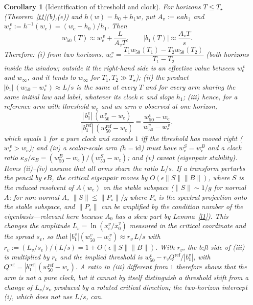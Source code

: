 \documentclass[11pt]{article}
\newtheorem{corollary}{Corollary}
\theoremstyle{definition}
\theoremstyle{remark}
\newcommand{\wcrit}{w_{\mathrm c}}
\newcommand{\wfifty}{w_{50}}
\newcommand{\xc}{x_{\mathrm c}}
\newcommand{\xmed}{\tilde x_0}
\newcommand{\Tstar}{T_\star}
\begin{document}
\begin{corollary}[Identification of threshold and clock]\label{c2}
For horizons $T\le\Tstar$ (Theorem~\ref{t1}(b),(e)) and $h(w)=h_0+h_1w$, put $A_v:=\kappa a h_1$ and $\wcrit^{\,v}:=h^{-1}(\wcrit)=(\wcrit-h_0)/h_1$. Then
\[
\wfifty(T)\approx\wcrit^{\,v}+\frac{L}{A_vT},\qquad |b_1(T)|\approx\frac{A_vT}{s}.
\]
Therefore: (i) from two horizons, $\wcrit^{\,v}=\dfrac{T_1\wfifty(T_1)-T_2\wfifty(T_2)}{T_1-T_2}$ (both horizons inside the window; outside it the right-hand side is an effective value between $\wcrit^{\,v}$ and $w_\infty$, and it tends to $w_\infty$ for $T_1,T_2\gg\Tstar$); (ii) the product $|b_1|\,(\wfifty-\wcrit^{\,v})\approx L/s$ is the same at every $T$ and for every arm sharing the same initial law and label, whatever its clock $\kappa$ and slope $h_1$; (iii) hence, for a reference arm with threshold $\wcrit$ and an arm $v$ observed at one horizon,
\[
\frac{|b_1^{v}|\,(\wfifty^{v}-\wcrit)}{|b_1^{\mathrm{ref}}|\,(\wfifty^{\mathrm{ref}}-\wcrit)}=\frac{\wfifty^{v}-\wcrit}{\wfifty^{v}-\wcrit^{\,v}},
\]
which equals $1$ for a pure clock and exceeds $1$ iff the threshold has moved \emph{right} ($\wcrit^{\,v}>\wcrit$); and (iv) a scalar-scale arm ($h=\mathrm{id}$) must have $\wcrit^{S}=\wcrit^{B}$ and a clock ratio $\kappa_S/\kappa_B=(\wfifty^B-\wcrit)/(\wfifty^S-\wcrit)$; and (v) \emph{caveat (eigenpair stability).} Items (ii)--(iv) assume that all arms share the ratio $L/s$. If a transform perturbs the pencil by $\epsilon B$, the critical eigenpair moves by $O(\epsilon\|S\|\|B\|)$, where $S$ is the reduced resolvent of $A(\wcrit)$ on the stable subspace ($\|S\|\sim1/g$ for normal $A$; for non-normal $A$, $\|S\|\le\|P_s\|/g$ where $P_s$ is the spectral projection onto the stable subspace, and $\|P_s\|$ can be amplified by the condition number of the eigenbasis---relevant here because $A_0$ has a skew part by Lemma~\ref{l1}). This changes the amplitude $L_v=\ln(\xc^v/\xmed^v)$ measured in the critical coordinate and the spread $s_v$, so that $|b_1^v|(\wfifty^v-\wcrit^{\,v})\approx r_v\,L/s$ with $r_v:=(L_v/s_v)/(L/s)=1+O(\epsilon\|S\|\|B\|)$. With $r_v$, the left side of (iii) is multiplied by $r_v$ and the implied threshold is $\wfifty^v-r_vQ^{\mathrm{ref}}/|b_1^v|$, with $Q^{\mathrm{ref}}=|b_1^{\mathrm{ref}}|(\wfifty^{\mathrm{ref}}-\wcrit)$. A ratio in (iii) different from $1$ therefore shows that the arm is not a pure clock, but it cannot by itself distinguish a threshold shift from a change of $L_v/s_v$ produced by a rotated critical direction; the two-horizon intercept (i), which does not use $L/s$, can.
\end{corollary}
\end{document}
